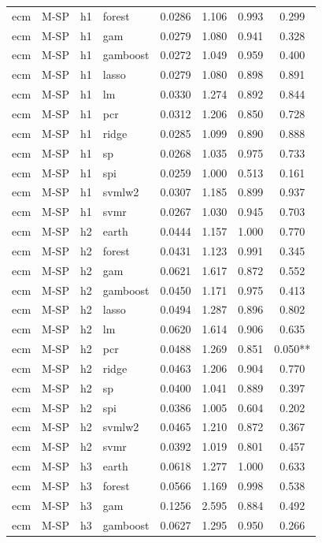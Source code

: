 \begin{ThreePartTable}
\begin{longtable}[t]{llclcccc}
ecm & M-SP & h1 & forest & 0.0286 & 1.106 & 0.993 & 0.299\\
ecm & M-SP & h1 & gam & 0.0279 & 1.080 & 0.941 & 0.328\\
ecm & M-SP & h1 & gamboost & 0.0272 & 1.049 & 0.959 & 0.400\\
ecm & M-SP & h1 & lasso & 0.0279 & 1.080 & 0.898 & 0.891\\
ecm & M-SP & h1 & lm & 0.0330 & 1.274 & 0.892 & 0.844\\
ecm & M-SP & h1 & pcr & 0.0312 & 1.206 & 0.850 & 0.728\\
ecm & M-SP & h1 & ridge & 0.0285 & 1.099 & 0.890 & 0.888\\
ecm & M-SP & h1 & sp & 0.0268 & 1.035 & 0.975 & 0.733\\
ecm & M-SP & h1 & spi & 0.0259 & 1.000 & 0.513 & 0.161\\
ecm & M-SP & h1 & svmlw2 & 0.0307 & 1.185 & 0.899 & 0.937\\
ecm & M-SP & h1 & svmr & 0.0267 & 1.030 & 0.945 & 0.703\\
\addlinespace
ecm & M-SP & h2 & earth & 0.0444 & 1.157 & 1.000 & 0.770\\
ecm & M-SP & h2 & forest & 0.0431 & 1.123 & 0.991 & 0.345\\
ecm & M-SP & h2 & gam & 0.0621 & 1.617 & 0.872 & 0.552\\
ecm & M-SP & h2 & gamboost & 0.0450 & 1.171 & 0.975 & 0.413\\
ecm & M-SP & h2 & lasso & 0.0494 & 1.287 & 0.896 & 0.802\\
ecm & M-SP & h2 & lm & 0.0620 & 1.614 & 0.906 & 0.635\\
ecm & M-SP & h2 & pcr & 0.0488 & 1.269 & 0.851 & 0.050**\\
ecm & M-SP & h2 & ridge & 0.0463 & 1.206 & 0.904 & 0.770\\
ecm & M-SP & h2 & sp & 0.0400 & 1.041 & 0.889 & 0.397\\
ecm & M-SP & h2 & spi & 0.0386 & 1.005 & 0.604 & 0.202\\
ecm & M-SP & h2 & svmlw2 & 0.0465 & 1.210 & 0.872 & 0.367\\
ecm & M-SP & h2 & svmr & 0.0392 & 1.019 & 0.801 & 0.457\\
\addlinespace
ecm & M-SP & h3 & earth & 0.0618 & 1.277 & 1.000 & 0.633\\
ecm & M-SP & h3 & forest & 0.0566 & 1.169 & 0.998 & 0.538\\
ecm & M-SP & h3 & gam & 0.1256 & 2.595 & 0.884 & 0.492\\
ecm & M-SP & h3 & gamboost & 0.0627 & 1.295 & 0.950 & 0.266\\

\end{longtable}
\end{ThreePartTable}
